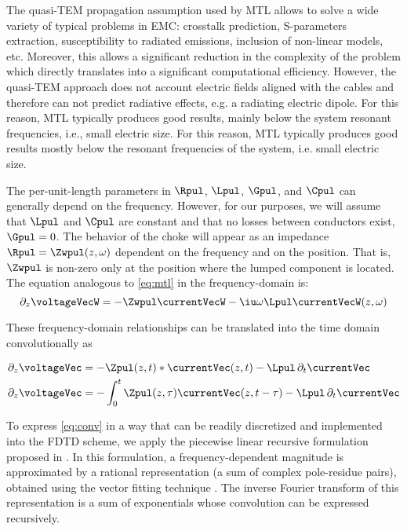     
The quasi-TEM propagation assumption used by MTL allows to solve a wide variety of typical problems in EMC: crosstalk prediction, S-parameters extraction, susceptibility to radiated emissions, inclusion of non-linear models, etc.
Moreover, this allows a significant reduction in the complexity of the problem which directly translates into a significant computational efficiency.
However, the quasi-TEM approach does not account electric fields aligned with the cables and therefore can not predict radiative effects, e.g. a radiating electric dipole.
For this reason, MTL typically produces good results, mainly below the system resonant frequencies, i.e., small electric size. For this reason, MTL typically produces good results mostly below the resonant frequencies of the system, i.e. small electric size. 

The per-unit-length parameters in $\Rpul$, $\Lpul$, $\Gpul$, and $\Cpul$ can generally depend on the frequency. 
However, for our purposes, we will assume that $\Lpul$ and $\Cpul$ are constant and that no losses between conductors exist, $\Gpul = 0$. 
The behavior of the choke will appear as an impedance $\Rpul = \Zwpul(z, \omega)$ dependent on the frequency and on the position. 
That is, $\Zwpul$ is non-zero only at the position where the lumped component is located. The equation analogous to \autoref{eq:mtl} in the frequency-domain is:
\begin{equation}\label{eq:mlt-i-freq}
	\partial_z \voltageVecW = -\Zwpul \currentVecW  - \iu \omega \Lpul \currentVecW(z, \omega) 
\end{equation}

These frequency-domain relationships can be translated into the time domain convolutionally as

\begin{align}
	\partial_z \voltageVec &= -\Zpul(z,t) \ast \currentVec(z,t)  - \Lpul \, \partial_t \currentVec \nonumber \\
	\partial_z \voltageVec &= -\int_0^{t} \Zpul(z,\tau) \currentVec(z,t-\tau)  - \Lpul \, \partial_t \currentVec \label{eq:conv}
\end{align}

To express \autoref{eq:conv} in a way that can be readily discretized and implemented into the FDTD scheme, we apply the piecewise linear recursive formulation proposed in \cite{Oh1995}. In this formulation, a frequency-dependent magnitude is approximated by a rational representation (a sum of complex pole-residue pairs), obtained using the vector fitting technique \cite{Gustavsen1999,Gustavsen2006}. The inverse Fourier transform of this representation is a sum of exponentials whose convolution can be expressed recursively. 

